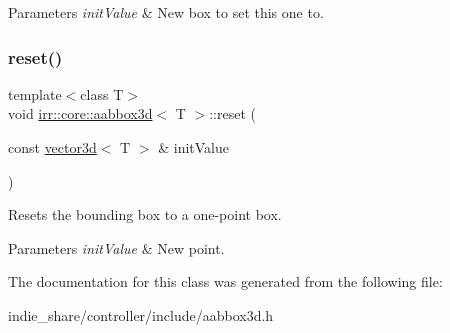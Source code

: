 \begin{DoxyParams}{Parameters}
{\em init\+Value} & New box to set this one to. \\
\hline
\end{DoxyParams}
\mbox{\label{classirr_1_1core_1_1aabbox3d_af777a607745b2bd3f4390dfee8263944}} 
\subsubsection{\texorpdfstring{reset()}{reset()}\hspace{0.1cm}{\footnotesize\ttfamily [3/3]}}
{\footnotesize\ttfamily template$<$class T$>$ \\
void \hyperlink{classirr_1_1core_1_1aabbox3d}{irr\+::core\+::aabbox3d}$<$ T $>$\+::reset (\begin{DoxyParamCaption}\item[{const \hyperlink{classirr_1_1core_1_1vector3d}{vector3d}$<$ T $>$ \&}]{init\+Value }\end{DoxyParamCaption})\hspace{0.3cm}{\ttfamily [inline]}}



Resets the bounding box to a one-\/point box. 


\begin{DoxyParams}{Parameters}
{\em init\+Value} & New point. \\
\hline
\end{DoxyParams}


The documentation for this class was generated from the following file\+:\begin{DoxyCompactItemize}
\item 
indie\+\_\+share/controller/include/aabbox3d.\+h\end{DoxyCompactItemize}
